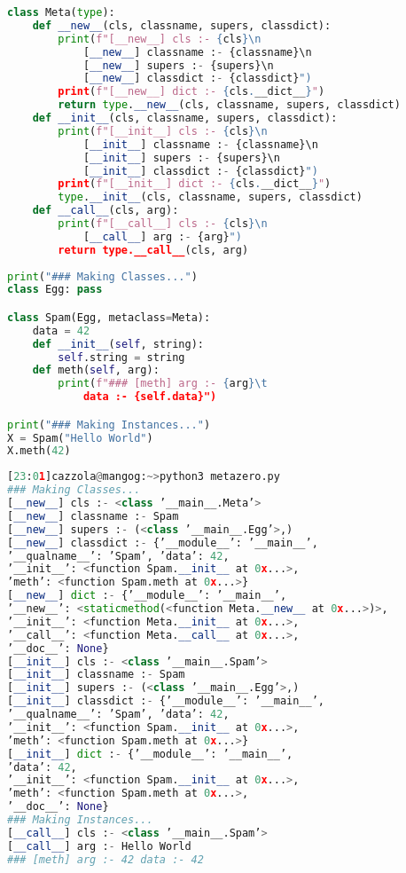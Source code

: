 \begin{lstlisting}[language=Python]
class Meta(type):
	def __new__(cls, classname, supers, classdict):
		print(f"[__new__] cls :- {cls}\n
			[__new__] classname :- {classname}\n
			[__new__] supers :- {supers}\n
			[__new__] classdict :- {classdict}")
		print(f"[__new__] dict :- {cls.__dict__}")
		return type.__new__(cls, classname, supers, classdict)
	def __init__(cls, classname, supers, classdict):
		print(f"[__init__] cls :- {cls}\n
			[__init__] classname :- {classname}\n
			[__init__] supers :- {supers}\n
			[__init__] classdict :- {classdict}")
		print(f"[__init__] dict :- {cls.__dict__}")
		type.__init__(cls, classname, supers, classdict)
	def __call__(cls, arg):
		print(f"[__call__] cls :- {cls}\n
			[__call__] arg :- {arg}")
		return type.__call__(cls, arg)
		
print("### Making Classes...")
class Egg: pass

class Spam(Egg, metaclass=Meta):
	data = 42
	def __init__(self, string):
		self.string = string
	def meth(self, arg):
		print(f"### [meth] arg :- {arg}\t
			data :- {self.data}")

print("### Making Instances...")
X = Spam("Hello World")
X.meth(42)
\end{lstlisting}

\begin{lstlisting}[language=Python]
[23:01]cazzola@mangog:~>python3 metazero.py
### Making Classes...
[__new__] cls :- <class ’__main__.Meta’>
[__new__] classname :- Spam
[__new__] supers :- (<class ’__main__.Egg’>,)
[__new__] classdict :- {’__module__’: ’__main__’,
’__qualname__’: ’Spam’, ’data’: 42,
’__init__’: <function Spam.__init__ at 0x...>,
’meth’: <function Spam.meth at 0x...>}
[__new__] dict :- {’__module__’: ’__main__’,
’__new__’: <staticmethod(<function Meta.__new__ at 0x...>)>,
’__init__’: <function Meta.__init__ at 0x...>,
’__call__’: <function Meta.__call__ at 0x...>,
’__doc__’: None}
[__init__] cls :- <class ’__main__.Spam’>
[__init__] classname :- Spam
[__init__] supers :- (<class ’__main__.Egg’>,)
[__init__] classdict :- {’__module__’: ’__main__’,
’__qualname__’: ’Spam’, ’data’: 42,
’__init__’: <function Spam.__init__ at 0x...>,
’meth’: <function Spam.meth at 0x...>}
[__init__] dict :- {’__module__’: ’__main__’,
’data’: 42,
’__init__’: <function Spam.__init__ at 0x...>,
’meth’: <function Spam.meth at 0x...>,
’__doc__’: None}
### Making Instances...
[__call__] cls :- <class ’__main__.Spam’>
[__call__] arg :- Hello World
### [meth] arg :- 42 data :- 42
\end{lstlisting}

